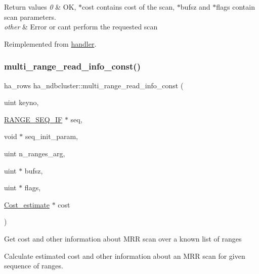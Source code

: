 \begin{DoxyRetVals}{Return values}
{\em 0} & OK, $\ast$cost contains cost of the scan, $\ast$bufsz and $\ast$flags contain scan parameters. \\
\hline
{\em other} & Error or can\textquotesingle{}t perform the requested scan \\
\hline
\end{DoxyRetVals}


Reimplemented from \mbox{\hyperlink{classhandler_a5add40a6cd7088ffef25a3816294b624}{handler}}.

\mbox{\label{classha__ndbcluster_abc8e0c56a5a9150ece910a132a05e826}} 
\subsubsection{\texorpdfstring{multi\+\_\+range\+\_\+read\+\_\+info\+\_\+const()}{multi\_range\_read\_info\_const()}}
{\footnotesize\ttfamily ha\+\_\+rows ha\+\_\+ndbcluster\+::multi\+\_\+range\+\_\+read\+\_\+info\+\_\+const (\begin{DoxyParamCaption}\item[{uint}]{keyno,  }\item[{\mbox{\hyperlink{structst__range__seq__if}{R\+A\+N\+G\+E\+\_\+\+S\+E\+Q\+\_\+\+IF}} $\ast$}]{seq,  }\item[{void $\ast$}]{seq\+\_\+init\+\_\+param,  }\item[{uint}]{n\+\_\+ranges\+\_\+arg,  }\item[{uint $\ast$}]{bufsz,  }\item[{uint $\ast$}]{flags,  }\item[{\mbox{\hyperlink{classCost__estimate}{Cost\+\_\+estimate}} $\ast$}]{cost }\end{DoxyParamCaption})\hspace{0.3cm}{\ttfamily [virtual]}}

Get cost and other information about M\+RR scan over a known list of ranges

Calculate estimated cost and other information about an M\+RR scan for given sequence of ranges.


